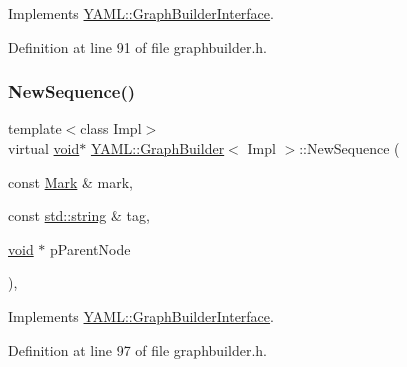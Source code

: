 Implements \mbox{\hyperlink{class_y_a_m_l_1_1_graph_builder_interface_a1d50e0b6c1a5d89a9ef62a5fefc74640}{Y\+A\+M\+L\+::\+Graph\+Builder\+Interface}}.



Definition at line 91 of file graphbuilder.\+h.

\mbox{\label{class_y_a_m_l_1_1_graph_builder_abfe9a35d5d8c61577234fbaaf9b0c5ef}} 
\subsubsection{\texorpdfstring{NewSequence()}{NewSequence()}}
{\footnotesize\ttfamily template$<$class Impl$>$ \\
virtual \mbox{\hyperlink{glad_8h_a950fc91edb4504f62f1c577bf4727c29}{void}}$\ast$ \mbox{\hyperlink{class_y_a_m_l_1_1_graph_builder}{Y\+A\+M\+L\+::\+Graph\+Builder}}$<$ Impl $>$\+::New\+Sequence (\begin{DoxyParamCaption}\item[{const \mbox{\hyperlink{struct_y_a_m_l_1_1_mark}{Mark}} \&}]{mark,  }\item[{const \mbox{\hyperlink{glad_8h_ac83513893df92266f79a515488701770}{std\+::string}} \&}]{tag,  }\item[{\mbox{\hyperlink{glad_8h_a950fc91edb4504f62f1c577bf4727c29}{void}} $\ast$}]{p\+Parent\+Node }\end{DoxyParamCaption})\hspace{0.3cm}{\ttfamily [inline]}, {\ttfamily [virtual]}}



Implements \mbox{\hyperlink{class_y_a_m_l_1_1_graph_builder_interface_a050ae61f3dc8e92015061d2a7af205f0}{Y\+A\+M\+L\+::\+Graph\+Builder\+Interface}}.



Definition at line 97 of file graphbuilder.\+h.

\mbox{\label{class_y_a_m_l_1_1_graph_builder_ae94e00378956c3d1dec2cce5cdbd70fc}} 
